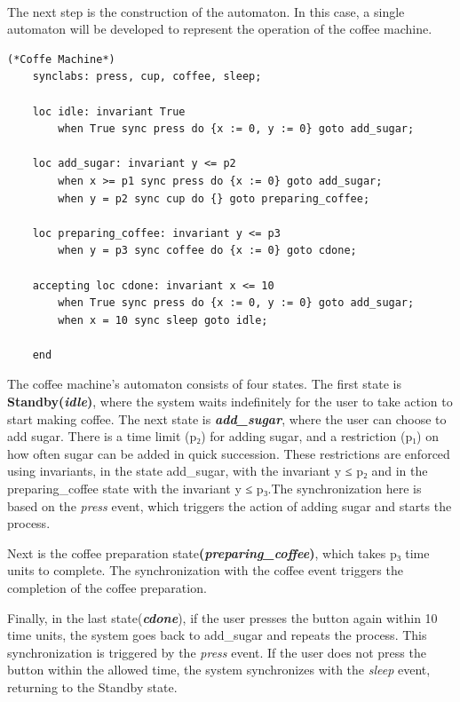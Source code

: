 \paragraph{}

The next step is the construction of the automaton. In this case, a single automaton will be developed to represent the operation of the coffee machine.

\begin{lstlisting}[language=UPPAAL]
    (*Coffe Machine*)
    synclabs: press, cup, coffee, sleep;

    loc idle: invariant True
    	when True sync press do {x := 0, y := 0} goto add_sugar;
    
    loc add_sugar: invariant y <= p2
    	when x >= p1 sync press do {x := 0} goto add_sugar;
    	when y = p2 sync cup do {} goto preparing_coffee;
    
    loc preparing_coffee: invariant y <= p3
    	when y = p3 sync coffee do {x := 0} goto cdone;
    
    accepting loc cdone: invariant x <= 10
    	when True sync press do {x := 0, y := 0} goto add_sugar;
    	when x = 10 sync sleep goto idle;
    
    end
\end{lstlisting}


The coffee machine's automaton consists of four states. The first state is \textbf{Standby(\textit{idle})}, where the system waits indefinitely for the user to take action to start making coffee. The next state is \textbf{\textit{add\_sugar}}, where the user can choose to add sugar. There is a time limit (p₂) for adding sugar, and a restriction (p₁) on how often sugar can be added in quick succession. These restrictions are enforced using invariants, in the state add\_sugar, with the invariant y ≤ p₂ and in the preparing\_coffee state with the invariant y ≤ p₃.The synchronization here is based on the \textit{press} event, which triggers the action of adding sugar and starts the process.

Next is the coffee preparation state\textbf{(\textit{preparing\_coffee})}, which takes p₃ time units to complete. The synchronization with the coffee event triggers the completion of the coffee preparation.

Finally, in the last state(\textbf{\textit{cdone}}), if the user presses the button again within 10 time units, the system goes back to add\_sugar and repeats the process. This synchronization is triggered by the \textit{press} event. If the user does not press the button within the allowed time, the system synchronizes with the \textit{sleep} event, returning to the Standby state.

